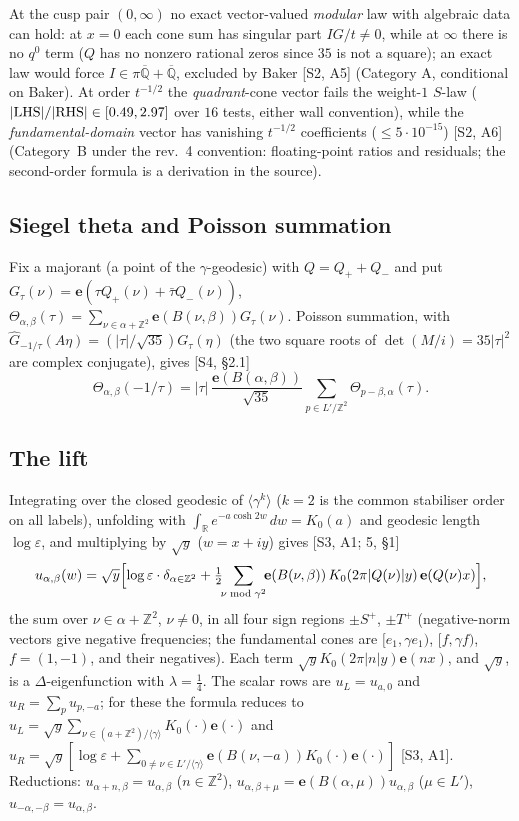\documentclass[11pt]{article}
\theoremstyle{definition}
\newcommand{\Z}{\mathbb{Z}}
\newcommand{\R}{\mathbb{R}}
\newcommand{\Qbar}{\overline{\mathbb{Q}}}
\newcommand{\e}{\mathbf{e}}
\newcommand{\src}[1]{\textup{[S#1]}}
\begin{document}
At the cusp pair $(0,\infty)$ no exact vector-valued \emph{modular} law with algebraic data can hold: at $x=0$ each cone sum has singular part
$IG/t\neq0$, while at $\infty$ there is no $q^0$ term ($Q$ has no nonzero rational zeros since $35$ is not a square); an exact law would force
$I\in\pi\Qbar+\Qbar$, excluded by Baker \src{2, A5} (Category A, conditional on Baker).
At order $t^{-1/2}$ the \emph{quadrant}-cone vector fails the weight-$1$ $S$-law ($|{\rm LHS}|/|{\rm RHS}|\in[0.49,2.97]$ over $16$ tests,
either wall convention), while the \emph{fundamental-domain} vector has vanishing $t^{-1/2}$ coefficients ($\le5\cdot10^{-15}$) \src{2, A6}
(Category~B under the rev.~4 convention: floating-point ratios and residuals; the second-order formula is a derivation in the source).

\subsection{Siegel theta and Poisson summation}
Fix a majorant (a point of the $\gamma$-geodesic) with $Q=Q_++Q_-$ and put $G_\tau(\nu)=\e(\tau Q_+(\nu)+\bar\tau Q_-(\nu))$,
$\Theta_{\alpha,\beta}(\tau)=\sum_{\nu\in\alpha+\Z^2}\e(B(\nu,\beta))G_\tau(\nu)$. Poisson summation, with
$\widehat G_{-1/\tau}(A\eta)=(|\tau|/\sqrt{35})G_\tau(\eta)$ (the two square roots of $\det(M/i)=35|\tau|^2$ are complex conjugate), gives
\src{4, \S2.1}
\begin{equation}\label{eq:thetaS}
\Theta_{\alpha,\beta}(-1/\tau)=|\tau|\,\frac{\e(B(\alpha,\beta))}{\sqrt{35}}\sum_{p\in L'/\Z^2}\Theta_{p-\beta,\alpha}(\tau).
\end{equation}

\subsection{The lift}
Integrating over the closed geodesic of $\langle\gamma^k\rangle$ ($k=2$ is the common stabiliser order on all labels), unfolding with
$\int_\R e^{-a\cosh2w}\,dw=K_0(a)$ and geodesic length $\log\varepsilon$, and multiplying by $\sqrt y$ ($w=x+iy$) gives \src{3, A1; 5, \S1}
\[
u_{\alpha,\beta}(w)=\sqrt y\Bigl[\log\varepsilon\cdot\delta_{\alpha\in\Z^2}+\tfrac12\!\!\sum_{\nu\bmod\gamma^2}\!\!\e(B(\nu,\beta))\,K_0(2\pi|Q(\nu)|y)\,\e(Q(\nu)x)\Bigr],
\]
the sum over $\nu\in\alpha+\Z^2$, $\nu\neq0$, in all four sign regions $\pm S^+$, $\pm T^+$ (negative-norm vectors give negative frequencies; the
fundamental cones are $[e_1,\gamma e_1)$, $[f,\gamma f)$, $f=(1,-1)$, and their negatives). Each term $\sqrt yK_0(2\pi|n|y)\e(nx)$, and $\sqrt y$,
is a $\Delta$-eigenfunction with $\lambda=\tfrac14$. The scalar rows are $u_L=u_{a,0}$ and $u_R=\sum_pu_{p,-a}$; for these the formula reduces to
$u_L=\sqrt y\sum_{\nu\in(a+\Z^2)/\langle\gamma\rangle}K_0(\cdot)\e(\cdot)$ and
$u_R=\sqrt y[\log\varepsilon+\sum_{0\neq\nu\in L'/\langle\gamma\rangle}\e(B(\nu,-a))K_0(\cdot)\e(\cdot)]$ \src{3, A1}.
Reductions: $u_{\alpha+n,\beta}=u_{\alpha,\beta}$ ($n\in\Z^2$), $u_{\alpha,\beta+\mu}=\e(B(\alpha,\mu))u_{\alpha,\beta}$ ($\mu\in L'$),
$u_{-\alpha,-\beta}=u_{\alpha,\beta}$.
\end{document}
